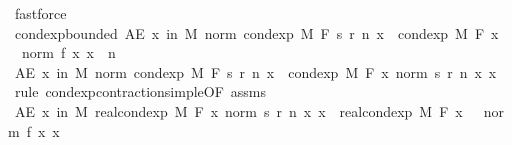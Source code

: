 \begin{isabellebody}
\ fastforce\isanewline
\isanewline
\ \ \isamarkupfalse%
\ cond{\isacharunderscore}{\kern0pt}exp{\isacharunderscore}{\kern0pt}bounded{\isacharcolon}{\kern0pt}\ {\isachardoublequoteopen}AE\ x\ in\ M{\isachardot}{\kern0pt}\ norm\ {\isacharparenleft}{\kern0pt}cond{\isacharunderscore}{\kern0pt}exp\ M\ F\ {\isacharparenleft}{\kern0pt}s\ {\isacharparenleft}{\kern0pt}r\ n{\isacharparenright}{\kern0pt}{\isacharparenright}{\kern0pt}\ x{\isacharparenright}{\kern0pt}\ {\isasymle}\ cond{\isacharunderscore}{\kern0pt}exp\ M\ F\ {\isacharparenleft}{\kern0pt}{\isasymlambda}x{\isachardot}{\kern0pt}\ {}\ {\isacharasterisk}{\kern0pt}\ norm\ {\isacharparenleft}{\kern0pt}f\ x{\isacharparenright}{\kern0pt}{\isacharparenright}{\kern0pt}\ x{\isachardoublequoteclose}\ \ n\isanewline
\ \ \isamarkupfalse%
\ {\isacharminus}{\kern0pt}\isanewline
\ \ \ \ \isamarkupfalse%
\ {\isachardoublequoteopen}AE\ x\ in\ M{\isachardot}{\kern0pt}\ norm\ {\isacharparenleft}{\kern0pt}cond{\isacharunderscore}{\kern0pt}exp\ M\ F\ {\isacharparenleft}{\kern0pt}s\ {\isacharparenleft}{\kern0pt}r\ n{\isacharparenright}{\kern0pt}{\isacharparenright}{\kern0pt}\ x{\isacharparenright}{\kern0pt}\ {\isasymle}\ cond{\isacharunderscore}{\kern0pt}exp\ M\ F\ {\isacharparenleft}{\kern0pt}{\isasymlambda}x{\isachardot}{\kern0pt}\ norm\ {\isacharparenleft}{\kern0pt}s\ {\isacharparenleft}{\kern0pt}r\ n{\isacharparenright}{\kern0pt}\ x{\isacharparenright}{\kern0pt}{\isacharparenright}{\kern0pt}\ x{\isachardoublequoteclose}\ \isamarkupfalse%
\ {\isacharparenleft}{\kern0pt}rule\ cond{\isacharunderscore}{\kern0pt}exp{\isacharunderscore}{\kern0pt}contraction{\isacharunderscore}{\kern0pt}simple{\isacharbrackleft}{\kern0pt}OF\ assms{\isacharparenleft}{\kern0pt}{}{\isacharcomma}{\kern0pt}{}{\isacharparenright}{\kern0pt}{\isacharbrackright}{\kern0pt}{\isacharparenright}{\kern0pt}\isanewline
\ \ \ \ \isamarkupfalse%
\ \isamarkupfalse%
\ {\isachardoublequoteopen}AE\ x\ in\ M{\isachardot}{\kern0pt}\ real{\isacharunderscore}{\kern0pt}cond{\isacharunderscore}{\kern0pt}exp\ M\ F\ {\isacharparenleft}{\kern0pt}{\isasymlambda}x{\isachardot}{\kern0pt}\ norm\ {\isacharparenleft}{\kern0pt}s\ {\isacharparenleft}{\kern0pt}r\ n{\isacharparenright}{\kern0pt}\ x{\isacharparenright}{\kern0pt}{\isacharparenright}{\kern0pt}\ x\ {\isasymle}\ real{\isacharunderscore}{\kern0pt}cond{\isacharunderscore}{\kern0pt}exp\ M\ F\ {\isacharparenleft}{\kern0pt}{\isasymlambda}x{\isachardot}{\kern0pt}\ {}\ {\isacharasterisk}{\kern0pt}\ norm\ {\isacharparenleft}{\kern0pt}f\ x{\isacharparenright}{\kern0pt}{\isacharparenright}{\kern0pt}\ x{\isachardoublequoteclose}\ \isamarkupfalse%

\end{isabellebody}
